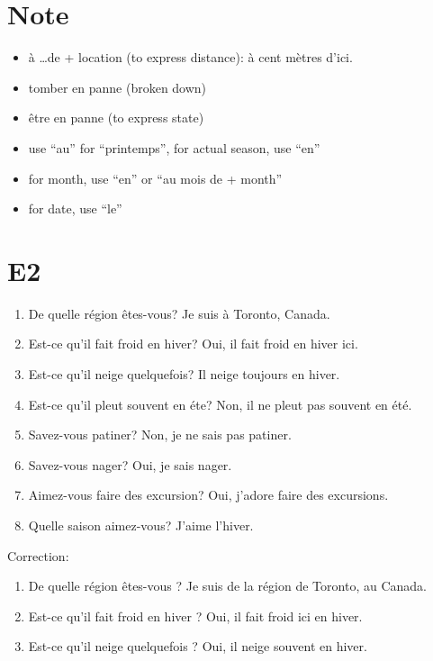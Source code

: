 \documentclass{book}
\begin{document}
    \section{Note}
        \begin{itemize}
            \item à \dots de + location (to express distance): à cent mètres d'ici.
            \item tomber en panne (broken down)
            \item être en panne (to express state)
            \item use ``au'' for ``printemps'', for actual season, use ``en''
            \item for month, use ``en'' or ``au mois de + month''
            \item for date, use ``le''
        \end{itemize}
    
    \section{E2}
        \begin{enumerate}
            \item De quelle région êtes-vous? Je suis à Toronto, Canada.
            \item Est-ce qu'il fait froid en hiver? Oui, il fait froid en hiver ici.
            \item Est-ce qu'il neige quelquefois? Il neige toujours en hiver.
            \item Est-ce qu'il pleut souvent en éte? Non, il ne pleut pas souvent en été.
            \item Savez-vous patiner? Non, je ne sais pas patiner.
            \item Savez-vous nager? Oui, je sais nager.
            \item Aimez-vous faire des excursion? Oui, j'adore faire des excursions.
            \item Quelle saison aimez-vous? J'aime l'hiver.
        \end{enumerate}
        Correction:
        \begin{enumerate}
            \item De quelle région êtes-vous ? Je suis de la région de Toronto, au Canada.
            \item Est-ce qu'il fait froid en hiver ? Oui, il fait froid ici en hiver.
            \item Est-ce qu'il neige quelquefois ? Oui, il neige souvent en hiver.
        \end{enumerate}
\end{document}
